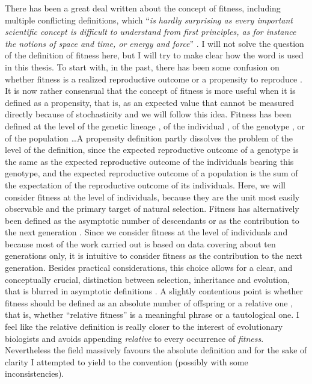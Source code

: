 There has been a great deal written about the concept of fitness, including multiple conflicting definitions, which ``\emph{is hardly surprising as every important scientific concept is difficult to understand from first principles, as for instance the notions of space and time, or energy and force}'' \parencite[p. 1358][]{Wagner2010}. I will not solve the question of the definition of fitness here, but I will try to make clear how the word is used in this thesis. To start with, in the past, there has been some confusion on whether fitness is a realized reproductive outcome or a propensity to reproduce \parencite{Brandon1984}. It is now rather consensual that the concept of fitness is more useful when it is defined as a propensity, that is, as an expected value that cannot be measured directly because of stochasticity \parencite{Brandon1984,Price1996,Krimbas2004} and we will follow this idea. Fitness has been defined at the level of the genetic lineage \parencite[e.g.][]{Akc2016}, of the individual \parencite[e.g.][]{Cam2000}, of the genotype \parencite[e.g.][]{Steiner2012}, or of the population \parencite[e.g.][]{vanTienderen2000}\dots A propensity definition partly dissolves the problem of the level of the definition, since the expected reproductive outcome of a genotype is the same as the expected reproductive outcome of the individuals bearing this genotype, and the expected reproductive outcome of a population is the sum of the expectation of the reproductive outcome of its individuals. Here, we will consider fitness at the level of individuals, because they are the unit most easily observable and the primary target of natural selection.
Fitness has alternatively been defined as the asymptotic number of descendants or as the contribution to the next generation \parencite{Wade2006}. Since we consider fitness at the level of individuals and because most of the work carried out is based on data covering about ten generations only, it is intuitive to consider fitness as the contribution to the next generation. Besides practical considerations, this choice allows for a clear, and conceptually crucial, distinction between selection, inheritance and evolution, that is blurred in asymptotic definitions \parencite{Fisher1930, Arnold1984}. 
A slightly contentious point is whether fitness should be defined as an absolute number of offspring \parencite{Wade2006} or a relative one \parencite{Rousset2004}, that is, whether ``relative fitness'' is a meaningful phrase or a tautological one. I feel like the relative definition is really closer to the interest of evolutionary biologists and avoids appending \emph{relative} to every occurrence of \emph{fitness}. Nevertheless the field massively favours the absolute definition and for the sake of clarity I attempted to yield to the convention (possibly with some inconsistencies). 
